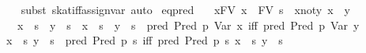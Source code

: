 \begin{isabellebody}
%
\isadelimproof
\ \ %
\endisadelimproof
%
\isatagproof
{}\isamarkupfalse%
\ {}subst\ skat{}iff{}assign{}var{}\ auto{}%
\endisatagproof
{\isafoldproof}%
%
\isadelimproof
\isanewline
%
\endisadelimproof
\isanewline
{}\isamarkupfalse%
\ eq{}pred{}\isanewline
\ \ \ x{}FV{}\ {}x\ {}\ FV\ s{}\ \ x{}not{}y{}\ {}x\ {}\ y{}\isanewline
\ \ \ {}x\ {}{}\ s\ {}\ y\ {}{}\ s\ {}\ x\ {}{}\ s\ {}\ y\ {}{}\ s\ {}\ {}pred\ {}Pred\ p\ {}Var\ x{}{}\ iff\ pred\ {}Pred\ p\ {}Var\ y{}{}{}{}\isanewline
%
\isadelimproof
%
\endisadelimproof
%
\isatagproof
{}\isamarkupfalse%
\ {}\isanewline
\ \ \isamarkupfalse%
\ {}x\ {}{}\ s{}\ y\ {}{}\ s\ {}\ pred\ {}Pred\ p\ {}s{}{}\ iff\ pred\ {}Pred\ p\ {}s{}{}{}\ x\ {}{}\ s{}\ y\ {}{}\ s{}\isanewline

\end{isabellebody}

